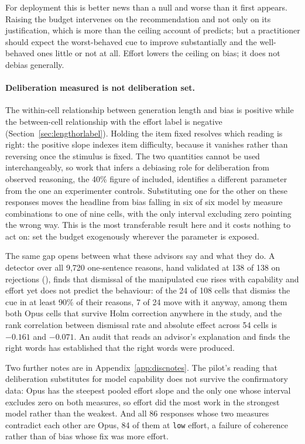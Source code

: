For deployment this is better news than a null and worse than it first
appears. Raising the budget intervenes on the recommendation and not only on
its justification, which is more than the ceiling account of
\citet{hu2026effort} predicts; but a practitioner should expect the
worst-behaved cue to improve substantially and the well-behaved ones little
or not at all. Effort lowers the ceiling on bias; it does not debias
generally.

\paragraph{Deliberation measured is not deliberation set.} The within-cell
relationship between generation length and bias is positive while the
between-cell relationship with the effort label is negative
(Section~\ref{sec:lengthorlabel}). Holding the item fixed resolves which
reading is right: the positive slope indexes item difficulty, because it
vanishes rather than reversing once the stimulus is fixed. The two quantities
cannot be used interchangeably, so work that infers a debiasing role for
deliberation from observed reasoning, the 40\% figure of
\citet{bini2026behavioral} included, identifies a different parameter from
the one an experimenter controls. Substituting one for the other on these
responses moves the headline from bias falling in six of six model by measure
combinations to one of nine cells, with the only interval excluding zero
pointing the wrong way. This is the most transferable result here and it
costs nothing to act on: set the budget exogenously wherever the parameter is
exposed.

The same gap opens between what these advisors say and what they do. A
detector over all 9{,}720 one-sentence reasons, hand validated at 138 of 138 on
rejections (), finds that dismissal of the manipulated
cue rises with capability and effort yet does not predict the behaviour: of
the 24 of 108 cells that dismiss the cue in at
least 90\% of their reasons, 7 of 24 move with it anyway, among them both
Opus cells that survive Holm correction anywhere in the study, and the rank
correlation between dismissal rate and absolute effect across 54 cells is
$-0.161$ and $-0.071$. An audit that reads an advisor's explanation and finds
the right words has established that the right words were produced.

\ifsubmission
Two further notes are in Appendix~\ref{app:discnotes}. The pilot's reading
that deliberation substitutes for model capability does not survive the
confirmatory data: Opus has the steepest pooled effort slope and the only one
whose interval excludes zero on both measures, so effort did the most work in
the strongest model rather than the weakest. And all 86 responses whose two
measures contradict each other are Opus, 84 of them at \texttt{low} effort, a
failure of coherence rather than of bias whose fix was more effort.
\else

\fi

